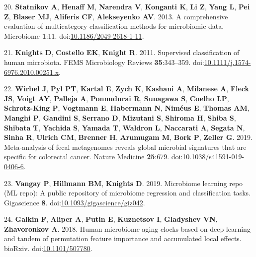\documentclass[11pt,]{article}
\begin{document}
\hypertarget{ref-statnikov_comprehensive_2013}{}
20. \textbf{Statnikov A}, \textbf{Henaff M}, \textbf{Narendra V},
\textbf{Konganti K}, \textbf{Li Z}, \textbf{Yang L}, \textbf{Pei Z},
\textbf{Blaser MJ}, \textbf{Aliferis CF}, \textbf{Alekseyenko AV}. 2013.
A comprehensive evaluation of multicategory classification methods for
microbiomic data. Microbiome \textbf{1}:11.
doi:\href{https://doi.org/10.1186/2049-2618-1-11}{10.1186/2049-2618-1-11}.

\hypertarget{ref-knights_supervised_2011}{}
21. \textbf{Knights D}, \textbf{Costello EK}, \textbf{Knight R}. 2011.
Supervised classification of human microbiota. FEMS Microbiology Reviews
\textbf{35}:343--359.
doi:\href{https://doi.org/10.1111/j.1574-6976.2010.00251.x}{10.1111/j.1574-6976.2010.00251.x}.

\hypertarget{ref-wirbel_meta-analysis_2019}{}
22. \textbf{Wirbel J}, \textbf{Pyl PT}, \textbf{Kartal E}, \textbf{Zych
K}, \textbf{Kashani A}, \textbf{Milanese A}, \textbf{Fleck JS},
\textbf{Voigt AY}, \textbf{Palleja A}, \textbf{Ponnudurai R},
\textbf{Sunagawa S}, \textbf{Coelho LP}, \textbf{Schrotz-King P},
\textbf{Vogtmann E}, \textbf{Habermann N}, \textbf{Niméus E},
\textbf{Thomas AM}, \textbf{Manghi P}, \textbf{Gandini S},
\textbf{Serrano D}, \textbf{Mizutani S}, \textbf{Shiroma H},
\textbf{Shiba S}, \textbf{Shibata T}, \textbf{Yachida S}, \textbf{Yamada
T}, \textbf{Waldron L}, \textbf{Naccarati A}, \textbf{Segata N},
\textbf{Sinha R}, \textbf{Ulrich CM}, \textbf{Brenner H},
\textbf{Arumugam M}, \textbf{Bork P}, \textbf{Zeller G}. 2019.
Meta-analysis of fecal metagenomes reveals global microbial signatures
that are specific for colorectal cancer. Nature Medicine
\textbf{25}:679.
doi:\href{https://doi.org/10.1038/s41591-019-0406-6}{10.1038/s41591-019-0406-6}.

\hypertarget{ref-vangay_microbiome_2019}{}
23. \textbf{Vangay P}, \textbf{Hillmann BM}, \textbf{Knights D}. 2019.
Microbiome learning repo (ML repo): A public repository of microbiome
regression and classification tasks. Gigascience \textbf{8}.
doi:\href{https://doi.org/10.1093/gigascience/giz042}{10.1093/gigascience/giz042}.

\hypertarget{ref-galkin_human_2018}{}
24. \textbf{Galkin F}, \textbf{Aliper A}, \textbf{Putin E},
\textbf{Kuznetsov I}, \textbf{Gladyshev VN}, \textbf{Zhavoronkov A}.
2018. Human microbiome aging clocks based on deep learning and tandem of
permutation feature importance and accumulated local effects. bioRxiv.
doi:\href{https://doi.org/10.1101/507780}{10.1101/507780}.
\end{document}

